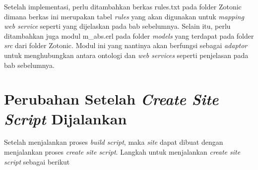 	Setelah implementasi, perlu ditambahkan berkas rules.txt pada folder Zotonic dimana berkas ini merupakan tabel \textit{rules} yang akan digunakan untuk \textit{mapping web service} seperti yang dijelaskan pada bab sebelumnya. Selain itu, perlu ditambahkan juga modul m\_abs.erl pada folder \textit{models} yang terdapat pada folder \textit{src} dari folder Zotonic. Modul ini yang nantinya akan berfungsi sebagai \textit{adaptor} untuk menghubungkan antara ontologi dan \textit{web services} seperti penjelasan pada bab sebelumnya.
		
\section{Perubahan Setelah \textit{Create Site Script} Dijalankan}

Setelah menjalankan proses \textit{build script}, maka \textit{site} dapat dibuat dengan menjalankan proses \textit{create site script}. Langkah untuk menjalankan \textit{create site script} sebagai berikut

